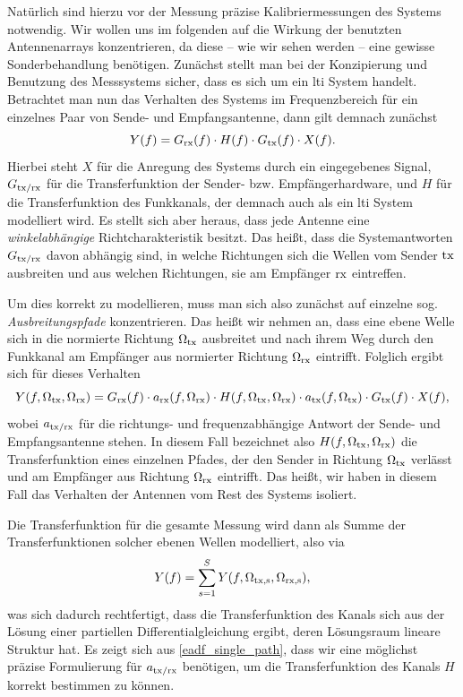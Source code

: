Nat\"urlich sind hierzu vor der Messung pr\"azise Kalibriermessungen des Systems notwendig.
Wir wollen uns im folgenden auf die Wirkung der benutzten Antennenarrays konzentrieren, da diese -- wie wir sehen werden -- eine gewisse Sonderbehandlung ben\"otigen.
Zun\"achst stellt man bei der Konzipierung und Benutzung des Messsystems sicher, dass es sich um ein \gls{lti} System handelt.
Betrachtet man nun das Verhalten des Systems im Frequenzbereich f\"ur ein einzelnes Paar von Sende- und Empfangsantenne, dann gilt demnach zun\"achst
\begin{equation}
    Y(f) = G_{\rm rx}(f) \cdot H(f) \cdot G_{\rm tx}(f) \cdot X(f).
\end{equation}
Hierbei steht $X$ f\"ur die Anregung des Systems durch ein eingegebenes Signal, $G_{\rm tx/\rm rx}$ f\"ur die Transferfunktion der Sender- bzw. Empf\"angerhardware, und $H$ f\"ur die Transferfunktion des Funkkanals, der demnach auch als ein \gls{lti} System modelliert wird.
Es stellt sich aber heraus, dass jede Antenne eine \emph{winkelabh\"angige} Richtcharakteristik besitzt.
Das hei{\ss}t, dass die Systemantworten $G_{\rm tx/\rm rx}$ davon abh\"angig sind, in welche Richtungen sich die Wellen vom Sender $\rm tx$ ausbreiten und aus welchen Richtungen, sie am Empf\"anger $\rm rx$ eintreffen. 

Um dies korrekt zu modellieren, muss man sich also zun\"achst auf einzelne sog. \emph{Ausbreitungspfade} konzentrieren.
Das hei{\ss}t wir nehmen an, dass eine ebene Welle sich in die normierte Richtung $\Omega_{\rm tx}$ ausbreitet und nach ihrem Weg durch den Funkkanal am Empf\"anger aus normierter Richtung $\Omega_{\rm rx}$ eintrifft. 
Folglich ergibt sich f\"ur dieses Verhalten
\begin{equation}\label{eadf_single_path}
    Y(f, \Omega_{\rm tx}, \Omega_{\rm rx}) = 
        G_{\rm rx}(f) \cdot a_{\rm rx}(f, \Omega_{\rm rx})
        \cdot H(f, \Omega_{\rm tx}, \Omega_{\rm rx}) 
        \cdot a_{\rm tx}(f, \Omega_{\rm tx}) \cdot G_{\rm tx}(f)
        \cdot X(f),
\end{equation}
%
wobei $a_{\rm tx/\rm rx}$ f\"ur die richtungs- und frequenzabh\"angige Antwort der Sende- und Empfangsantenne stehen.
In diesem Fall bezeichnet also $H(f, \Omega_{\rm tx}, \Omega_{\rm rx})$ die Transferfunktion eines einzelnen Pfades, der den Sender in Richtung $\Omega_{\rm tx}$ verl\"asst und am Empf\"anger aus Richtung $\Omega_{\rm rx}$ eintrifft.
Das hei{\ss}t, wir haben in diesem Fall das Verhalten der Antennen vom Rest des Systems isoliert. 

Die Transferfunktion f\"ur die gesamte Messung wird dann als Summe der Transferfunktionen solcher ebenen Wellen modelliert, also via
\begin{equation}
    Y(f) = {\sum\limits_{s = 1}^{S}{
        Y(f, \Omega_{\rm tx,s}, \Omega_{\rm rx,s})
    }},
\end{equation}
was sich dadurch rechtfertigt, dass die Transferfunktion des Kanals sich aus der L\"osung einer partiellen Differentialgleichung ergibt, deren L\"osungsraum lineare Struktur hat.
Es zeigt sich aus \eqref{eadf_single_path}, dass wir eine m\"oglichst pr\"azise Formulierung f\"ur $a_{\rm tx/\rm rx}$ ben\"otigen, um die Transferfunktion des Kanals $H$ korrekt bestimmen zu k\"onnen.
%
%
%
